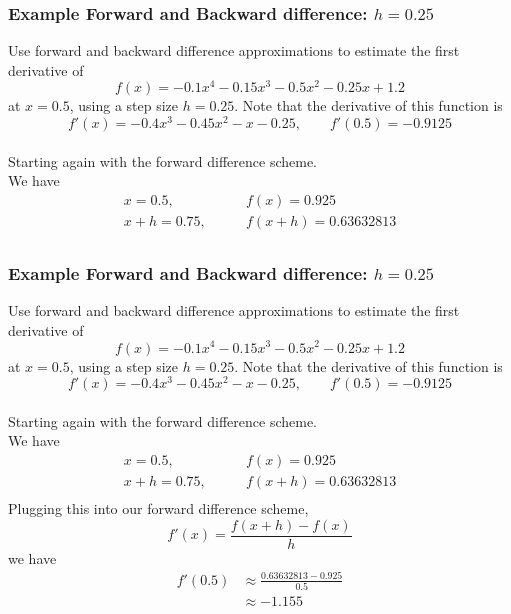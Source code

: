 \documentclass{if-beamer}
\begin{document}

\begin{frame}
\frametitle{Example Forward and Backward difference: $h= 0.25$}
Use forward and backward difference approximations to estimate the first derivative of
$$f(x) = -0.1x^4-0.15x^3-0.5x^2-0.25x+1.2 $$
at $x=0.5$, using a step size $h = 0.25$. Note that the derivative of this function is
$$f'(x) = -0.4x^3-0.45x^2-x-0.25, \qquad f'(0.5) = -0.9125$$
\\\vspace{5pt}
Starting again with the forward difference scheme.\\\vspace{5pt}
We have
\begin{align*}
x = 0.5, \qquad &f(x) = 0.925\\
x+h = 0.75, \qquad &f(x+h) = 0.63632813\\
\end{align*}
\end{frame}


\begin{frame}
\frametitle{Example Forward and Backward difference: $h= 0.25$}
Use forward and backward difference approximations to estimate the first derivative of
$$f(x) = -0.1x^4-0.15x^3-0.5x^2-0.25x+1.2 $$
at $x=0.5$, using a step size $h = 0.25$. Note that the derivative of this function is
$$f'(x) = -0.4x^3-0.45x^2-x-0.25, \qquad f'(0.5) = -0.9125$$
\\\vspace{5pt}
Starting again with the forward difference scheme.\\\vspace{5pt}
We have
\begin{align*}
x = 0.5, \qquad &f(x) = 0.925\\
x+h = 0.75, \qquad &f(x+h) = 0.63632813\\
\end{align*}
Plugging this into our forward difference scheme, 
$$f'(x) = \frac{f(x+h)-f(x)}{h} $$
we have
\begin{align*}
f'(0.5) &\approx \frac{0.63632813-0.925}{0.5} \\
&\approx -1.155
\end{align*}
\end{frame}
\end{document}
